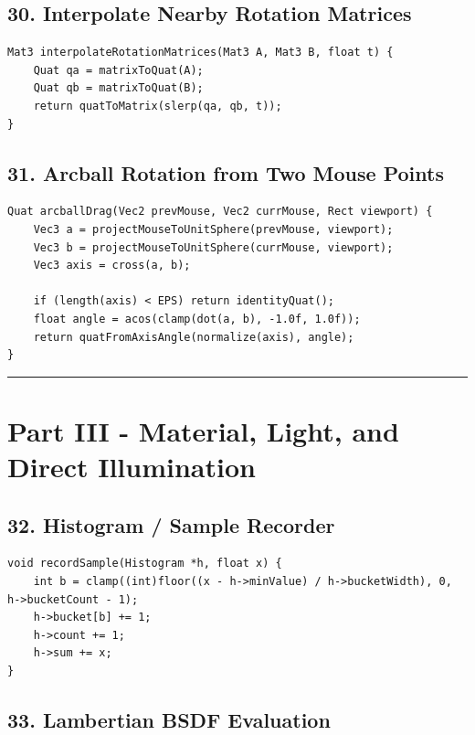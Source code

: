 \documentclass[10pt,letterpaper]{article}
\begin{document}
\subsection{30. Interpolate Nearby Rotation Matrices}

\begin{verbatim}
Mat3 interpolateRotationMatrices(Mat3 A, Mat3 B, float t) {
    Quat qa = matrixToQuat(A);
    Quat qb = matrixToQuat(B);
    return quatToMatrix(slerp(qa, qb, t));
}
\end{verbatim}

\subsection{31. Arcball Rotation from Two Mouse Points}

\begin{verbatim}
Quat arcballDrag(Vec2 prevMouse, Vec2 currMouse, Rect viewport) {
    Vec3 a = projectMouseToUnitSphere(prevMouse, viewport);
    Vec3 b = projectMouseToUnitSphere(currMouse, viewport);
    Vec3 axis = cross(a, b);

    if (length(axis) < EPS) return identityQuat();
    float angle = acos(clamp(dot(a, b), -1.0f, 1.0f));
    return quatFromAxisAngle(normalize(axis), angle);
}
\end{verbatim}

\medskip\hrule\medskip

\clearpage
\section{Part III - Material, Light, and Direct Illumination}

\subsection{32. Histogram / Sample Recorder}

\begin{verbatim}
void recordSample(Histogram *h, float x) {
    int b = clamp((int)floor((x - h->minValue) / h->bucketWidth), 0, h->bucketCount - 1);
    h->bucket[b] += 1;
    h->count += 1;
    h->sum += x;
}
\end{verbatim}

\subsection{33. Lambertian BSDF Evaluation}
\end{document}
